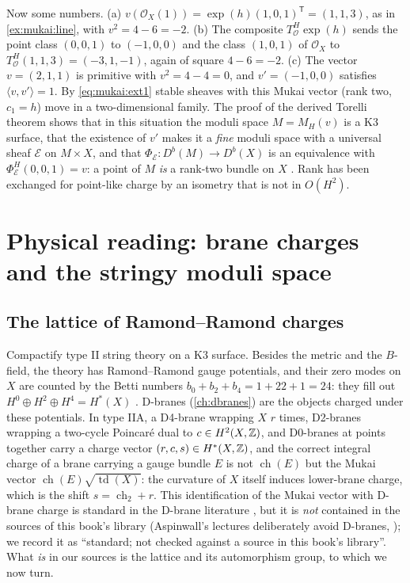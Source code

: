 Now some numbers. (a) $v(\mathcal O_X(1))=\exp(h)(1,0,1)^{\mathsf T}=(1,1,3)$, as in
\cref{ex:mukai:line}, with $v^2=4-6=-2$. (b) The composite $T^H_{\mathcal O}\exp(h)$ sends the
point class $(0,0,1)$ to $(-1,0,0)$ and the class $(1,0,1)$ of $\mathcal O_X$ to
$T^H_{\mathcal O}(1,1,3)=(-3,1,-1)$, again of square $4-6=-2$. (c) The vector $v=(2,1,1)$ is
primitive with $v^2=4-4=0$, and $v'=(-1,0,0)$ satisfies $\langle v,v'\rangle=1$. By
\eqref{eq:mukai:ext1} stable sheaves with this Mukai vector (rank two, $c_1=h$) move in a
two-dimensional family. The proof of the derived Torelli theorem shows that in this situation
the moduli space $M=M_H(v)$ is a K3 surface, that the existence of $v'$ makes it a \emph{fine}
moduli space with a universal sheaf $\mathcal E$ on $M\times X$, and that
$\Phi_{\mathcal E}:D^b(M)\to D^b(X)$ is an equivalence with
$\Phi^H_{\mathcal E}(0,0,1)=v$: a point of $M$ \emph{is} a rank-two bundle on $X$
. Rank has been exchanged for point-like charge by an isometry that
is not in $O(H^2)$.

\section{Physical reading: brane charges and the stringy moduli space}\label{sec:mukai:physics}

\subsection{The lattice of Ramond--Ramond charges}
Compactify type II string theory on a K3 surface. Besides the metric and the $B$-field, the
theory has Ramond--Ramond gauge potentials, and their zero modes on $X$ are counted by the
Betti numbers $b_0+b_2+b_4=1+22+1=24$: they fill out $H^0\oplus H^2\oplus H^4=H^*(X)$
. D-branes (\cref{ch:dbranes}) are the
objects charged under these potentials. In type IIA, a D4-brane wrapping $X$ $r$ times, D2-branes
wrapping a two-cycle Poincar\'e dual to $c\in H^2(X,\mathbb{Z})$, and D0-branes at points together
carry a charge vector $(r,c,s)\in H^*(X,\mathbb{Z})$, and the correct integral charge of a brane carrying
a gauge bundle $E$ is not $\operatorname{ch}(E)$ but the Mukai vector
$\operatorname{ch}(E)\sqrt{\operatorname{td}(X)}$: the curvature of $X$ itself induces lower-brane
charge, which is the shift $s=\operatorname{ch}_2+r$. This identification of the Mukai vector
with D-brane charge is standard in the D-brane literature \TL, but it is \emph{not} contained in
the sources of this book's library (Aspinwall's lectures deliberately avoid D-branes,
); we record it as ``standard; not checked against a source in this
book's library''. What \emph{is} in our sources is the lattice and its automorphism group, to
which we now turn.

